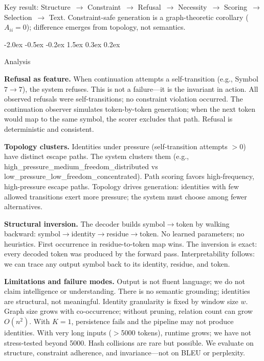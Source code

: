\documentclass[10pt]{article}
\makeatletter
\renewcommand{\section}{\@startsection{section}{1}{\z@}%
  {-2.0ex \@plus -0.5ex \@minus -0.2ex}%
  {1.5ex \@plus 0.3ex \@minus 0.2ex}%
  {\large\bfseries\raggedright}}
\makeatother
\begin{document}
Key result: Structure~$\rightarrow$ Constraint~$\rightarrow$ Refusal~$\rightarrow$
Necessity~$\rightarrow$ Scoring~$\rightarrow$ Selection~$\rightarrow$ Text.
Constraint-safe generation is a graph-theoretic corollary ($A_{ii} = 0$); difference
emerges from topology, not semantics.

\section{Analysis}
\label{sec:analysis}

\textbf{Refusal as feature.}
When continuation attempts a self-transition (e.g., Symbol~$7\rightarrow 7$), the
system refuses. This is not a failure---it is the invariant in action. All observed
refusals were self-transitions; no constraint violation occurred. The continuation
observer simulates token-by-token generation; when the next token would map to the
same symbol, the scorer excludes that path. Refusal is deterministic and consistent.

\textbf{Topology clusters.}
Identities under pressure (self-transition attempts $>0$) have distinct escape paths.
The system clusters them (e.g., high\_pressure\_medium\_freedom\_distributed vs
low\_pressure\_low\_freedom\_concentrated). Path scoring favors high-frequency,
high-pressure escape paths. Topology drives generation: identities with few allowed
transitions exert more pressure; the system must choose among fewer alternatives.

\textbf{Structural inversion.}
The decoder builds symbol$\rightarrow$token by walking backward:
symbol$\rightarrow$identity$\rightarrow$residue$\rightarrow$token. No learned
parameters; no heuristics. First occurrence in residue-to-token map wins. The inversion
is exact: every decoded token was produced by the forward pass. Interpretability
follows: we can trace any output symbol back to its identity, residue, and token.

\textbf{Limitations and failure modes.}
Output is not fluent language; we do not claim intelligence or understanding. There is
no semantic grounding; identities are structural, not meaningful. Identity granularity
is fixed by window size $w$. Graph size grows with co-occurrence; without pruning,
relation count can grow $O(n^2)$. With $K=1$, persistence fails and the pipeline may
not produce identities. With very long inputs ($>$5000 tokens), runtime grows; we have
not stress-tested beyond 5000. Hash collisions are rare but possible.
We evaluate on structure, constraint adherence, and invariance---not on BLEU or
perplexity.
\end{document}
